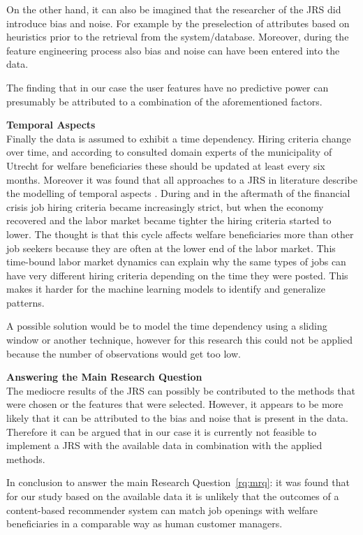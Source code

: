 On the other hand, it can also be imagined that the researcher of the JRS did introduce bias and noise.
For example by the preselection of attributes based on heuristics prior to the retrieval from the system/database.
Moreover, during the feature engineering process also bias and noise can have been entered into the data.

The finding that in our case the user features have no predictive power can presumably be attributed to a combination of the aforementioned factors. 

\noindent
\textbf{Temporal Aspects} \\
Finally the data is assumed to exhibit a time dependency.
Hiring criteria change over time, and according to consulted domain experts of the municipality of Utrecht for welfare beneficiaries these should be updated at least every six months. 
Moreover it was found that all approaches to a JRS in literature describe the modelling of temporal aspects  \cite{kenthapadi2017personalized, T.Al-Otaibi2012ASystems, Zheng2012JobSurvey, hong2013job}.
During and in the aftermath of the financial crisis job hiring criteria became increasingly strict, but when the economy recovered and the labor market became tighter the hiring criteria started to lower. 
The thought is that this cycle affects welfare beneficiaries more than other job seekers because they are often at the lower end of the labor market.
This time-bound labor market dynamics can explain why the same types of jobs can have very different hiring criteria depending on the time they were posted.
This makes it harder for the machine learning models to identify and generalize patterns.

A possible solution would be to model the time dependency using a sliding window or another technique, however for this research this could not be applied because the number of observations would get too low.

\noindent
\textbf{Answering the Main Research Question}\\
The mediocre results of the JRS can possibly be contributed to the methods that were chosen or the features that were selected. 
However, it appears to be more likely that it can be attributed to the bias and noise that is present in the data.
Therefore it can be argued that in our case it is currently not feasible to implement a JRS with the available data in combination with the applied methods. 

In conclusion to answer the main Research Question~\ref{rq:mrq}: it was found that for our study based on the available data it is unlikely that the outcomes of a content-based recommender system can match job openings with welfare beneficiaries in a comparable way as human customer managers. 

